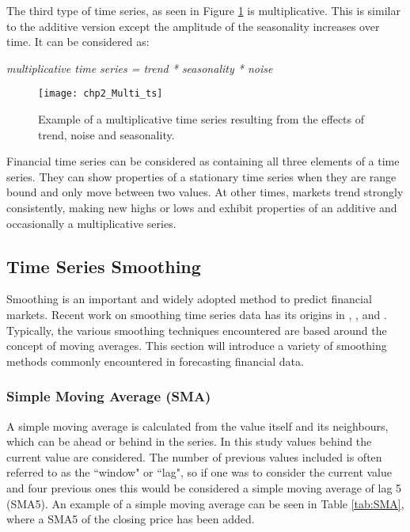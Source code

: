 The third type of time series, as seen in Figure \ref{fig:Multi_ts} is multiplicative. This is similar to the additive version except the amplitude of the seasonality increases over time. It can be considered as:

\begin{center}
\textit{multiplicative time series = trend * seasonality * noise}
\end{center}

\begin{figure}[tbph!]
\centering
\texttt{[image: chp2\_Multi\_ts]}
\caption[A multiplicative time series]{Example of a multiplicative time series resulting from the effects of trend, noise and seasonality.}
\label{fig:Multi_ts}
\end{figure}

Financial time series can be considered as containing all three elements of a time series. They can show properties of a stationary time series when they are range bound and only move between two values. At other times, markets trend strongly consistently, making new highs or lows and exhibit properties of an additive and occasionally a multiplicative series.

\subsection{Time Series Smoothing}
\label{sec:expsmoothing}
Smoothing is an important and widely adopted method to predict financial markets.  Recent work on smoothing time series data has its origins in \cite{brown1959statistical}, \cite{brown1963statistical}, \cite{Holt20045} and \cite{Winters1960}. Typically, the various smoothing techniques encountered are based around the concept of moving averages. This section will introduce a variety of smoothing methods commonly encountered in forecasting financial data. 

\subsubsection{Simple Moving Average (SMA)}
\label{sec:chp2_sma}
A simple moving average is calculated from the value itself and its neighbours, which can be ahead or behind in the series. In this study values behind the current value are considered. The number of previous values included is often referred to as the \textquotedblleft window" or \textquotedblleft lag", so if one was to consider the current value and four previous ones this would be considered a simple moving average of lag 5 (SMA5). An example of a simple moving average can be seen in Table \ref{tab:SMA}, where a SMA5 of the closing price has been added.

